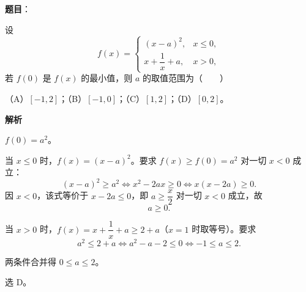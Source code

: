 \begin{answer}

\textbf{题目}：

设
\nopagebreak[4]
\[f(x)=\begin{cases}
(x-a)^2, & x\leqslant0,\\
x+\dfrac1x+a, & x>0,
\end{cases}\]
若 $f(0)$ 是 $f(x)$ 的最小值，则 $a$ 的取值范围为\mbox{（　　）}

（A）$[-1,2]$；（B）$[-1,0]$；（C）$[1,2]$；（D）$[0,2]$。

\textbf{解析}

$f(0)=a^2$。

当 $x\leqslant0$ 时，$f(x)=(x-a)^2$。要求 $f(x)\geqslant f(0)=a^2$ 对一切 $x<0$ 成立：
\nopagebreak[4]
\[(x-a)^2\geqslant a^2\iff x^2-2ax\geqslant0\iff x(x-2a)\geqslant0 .\]
因 $x<0$，该式等价于 $x-2a\leqslant0$，即 $a\geqslant\dfrac x2$ 对一切 $x<0$ 成立，故
\nopagebreak[4]
\[a\geqslant0 .\]

当 $x>0$ 时，$f(x)=x+\dfrac1x+a\geqslant2+a$（$x=1$ 时取等号）。要求
\nopagebreak[4]
\[a^2\leqslant2+a\iff a^2-a-2\leqslant0\iff-1\leqslant a\leqslant2 .\]

两条件合并得 $0\leqslant a\leqslant2$。

选 D。


\end{answer}
